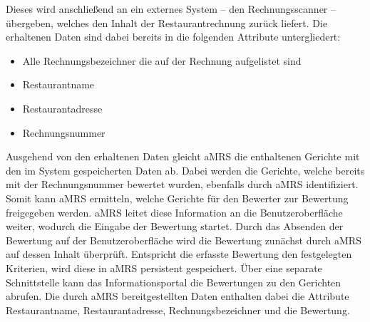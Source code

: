 Dieses wird anschließend an ein externes System -- den Rechnungsscanner -- übergeben, welches den Inhalt der Restaurantrechnung zurück liefert.
Die erhaltenen Daten sind dabei bereits in die folgenden Attribute untergliedert:
\begin{itemize}
  \item Alle Rechnungsbezeichner die auf der Rechnung aufgelistet sind
  \item Restaurantname
  \item Restaurantadresse
  \item Rechnungsnummer
\end{itemize}
Ausgehend von den erhaltenen Daten gleicht \ac{aMRS} die enthaltenen Gerichte mit den im System gespeicherten Daten ab.
Dabei werden die Gerichte, welche bereits mit der Rechnungsnummer bewertet wurden, ebenfalls durch \ac{aMRS} identifiziert.
Somit kann \ac{aMRS} ermitteln, welche Gerichte für den Bewerter zur Bewertung freigegeben werden.
\ac{aMRS} leitet diese Information an die Benutzeroberfläche weiter, wodurch die Eingabe der Bewertung startet.
\newparagraph
Durch das Absenden der Bewertung auf der Benutzeroberfläche wird die Bewertung zunächst durch \ac{aMRS} auf dessen Inhalt überprüft.
Entspricht die erfasste Bewertung den festgelegten Kriterien, wird diese in \ac{aMRS} persistent gespeichert.
\newparagraph
Über eine separate Schnittstelle kann das Informationsportal die Bewertungen zu den Gerichten abrufen.
Die durch \ac{aMRS} bereitgestellten Daten enthalten dabei die Attribute Restaurantname, Restaurantadresse, Rechnungsbezeichner und die Bewertung.
